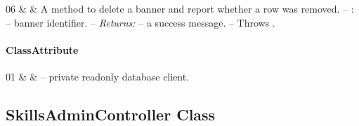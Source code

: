 \begin{ClassMethodTable}
06 &  &
A method to delete a banner and report whether a row was removed.
\newline -- :  -- banner identifier.
\newline -- \textit{Returns:}  -- a success message.
\newline -- Throws . \\ \hline
\end{ClassMethodTable}

\paragraph{ClassAttribute}
\begin{ClassAttributeTable}
01 &  &  -- private readonly database client. \\ \hline
\end{ClassAttributeTable}

\subsection{SkillsAdminController Class}

